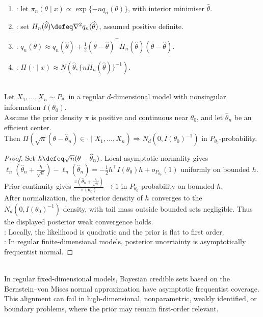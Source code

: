 \begin{method} \label{meth:laplace-approximation-posterior} 
\begin{enumerate}[label=(\roman*)]
\setlength{\itemsep}{0pt}
\item {}: let $\pi_n(\theta\mid x)\propto\exp\{-nq_n(\theta)\}$, with interior minimiser $\widehat{\theta}$.
\item {}: set $H_n(\widehat{\theta})\defeq\nabla^2q_n(\widehat{\theta})$, assumed positive definite.
\item {}: $q_n(\theta)\approx q_n(\widehat{\theta})+\frac12(\theta-\widehat{\theta})^\top H_n(\widehat{\theta})(\theta-\widehat{\theta})$.
\item {}: $\Pi(\cdot\mid x)\approx N(\widehat{\theta},\{nH_n(\widehat{\theta})\}^{-1})$.
\end{enumerate}
\end{method}

\begin{theorem} \label{thm:bernstein-von-mises-informal} \\
Let $X_1,\ldots,X_n\sim P_{\theta_0}$ in a regular $d$-dimensional model with nonsingular information $I(\theta_0)$.\\
Assume the prior density $\pi$ is positive and continuous near $\theta_0$, and let $\widehat{\theta}_n$ be an efficient center.\\
Then $\Pi(\sqrt{n}(\theta-\widehat{\theta}_n)\in\cdot\mid X_1,\ldots,X_n)\Rightarrow N_d(0,I(\theta_0)^{-1})$ in $P_{\theta_0}$-probability.
\begin{proof} Set $h\defeq\sqrt{n}(\theta-\widehat{\theta}_n)$. Local asymptotic normality gives $\ell_n(\widehat{\theta}_n+\frac{h}{\sqrt{n}})-\ell_n(\widehat{\theta}_n)=-\frac12h^\top I(\theta_0)h+o_{P_{\theta_0}}(1)$ uniformly on bounded $h$. Prior continuity gives $\frac{\pi(\widehat{\theta}_n+\frac{h}{\sqrt{n}})}{\pi(\theta_0)}\to1$ in $P_{\theta_0}$-probability on bounded $h$.\\
After normalization, the posterior density of $h$ converges to the $N_d(0,I(\theta_0)^{-1})$ density, with tail mass outside bounded sets negligible. Thus the displayed posterior weak convergence holds.\\
: Locally, the likelihood is quadratic and the prior is flat to first order.\\
: In regular finite-dimensional models, posterior uncertainty is asymptotically frequentist normal.
\end{proof}
\end{theorem}

\begin{remark} \label{rem:bayes-frequentist-alignment-and-limits} \\
In regular fixed-dimensional models, Bayesian credible sets based on the Bernstein--von Mises normal approximation have asymptotic frequentist coverage. This alignment can fail in high-dimensional, nonparametric, weakly identified, or boundary problems, where the prior may remain first-order relevant.
\end{remark}
